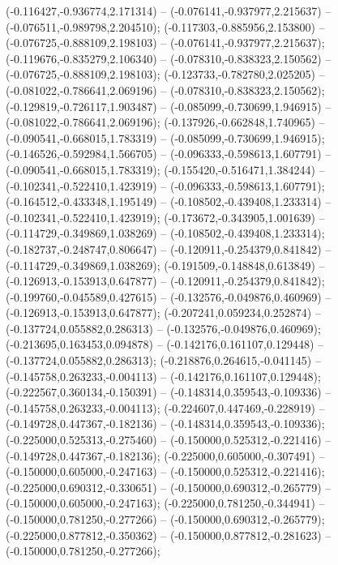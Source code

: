  (-0.116427,-0.936774,2.171314) -- (-0.076141,-0.937977,2.215637) -- (-0.076511,-0.989798,2.204510);
 (-0.117303,-0.885956,2.153800) -- (-0.076725,-0.888109,2.198103) -- (-0.076141,-0.937977,2.215637);
 (-0.119676,-0.835279,2.106340) -- (-0.078310,-0.838323,2.150562) -- (-0.076725,-0.888109,2.198103);
 (-0.123733,-0.782780,2.025205) -- (-0.081022,-0.786641,2.069196) -- (-0.078310,-0.838323,2.150562);
 (-0.129819,-0.726117,1.903487) -- (-0.085099,-0.730699,1.946915) -- (-0.081022,-0.786641,2.069196);
 (-0.137926,-0.662848,1.740965) -- (-0.090541,-0.668015,1.783319) -- (-0.085099,-0.730699,1.946915);
 (-0.146526,-0.592984,1.566705) -- (-0.096333,-0.598613,1.607791) -- (-0.090541,-0.668015,1.783319);
 (-0.155420,-0.516471,1.384244) -- (-0.102341,-0.522410,1.423919) -- (-0.096333,-0.598613,1.607791);
 (-0.164512,-0.433348,1.195149) -- (-0.108502,-0.439408,1.233314) -- (-0.102341,-0.522410,1.423919);
 (-0.173672,-0.343905,1.001639) -- (-0.114729,-0.349869,1.038269) -- (-0.108502,-0.439408,1.233314);
 (-0.182737,-0.248747,0.806647) -- (-0.120911,-0.254379,0.841842) -- (-0.114729,-0.349869,1.038269);
 (-0.191509,-0.148848,0.613849) -- (-0.126913,-0.153913,0.647877) -- (-0.120911,-0.254379,0.841842);
 (-0.199760,-0.045589,0.427615) -- (-0.132576,-0.049876,0.460969) -- (-0.126913,-0.153913,0.647877);
 (-0.207241,0.059234,0.252874) -- (-0.137724,0.055882,0.286313) -- (-0.132576,-0.049876,0.460969);
 (-0.213695,0.163453,0.094878) -- (-0.142176,0.161107,0.129448) -- (-0.137724,0.055882,0.286313);
 (-0.218876,0.264615,-0.041145) -- (-0.145758,0.263233,-0.004113) -- (-0.142176,0.161107,0.129448);
 (-0.222567,0.360134,-0.150391) -- (-0.148314,0.359543,-0.109336) -- (-0.145758,0.263233,-0.004113);
 (-0.224607,0.447469,-0.228919) -- (-0.149728,0.447367,-0.182136) -- (-0.148314,0.359543,-0.109336);
 (-0.225000,0.525313,-0.275460) -- (-0.150000,0.525312,-0.221416) -- (-0.149728,0.447367,-0.182136);
 (-0.225000,0.605000,-0.307491) -- (-0.150000,0.605000,-0.247163) -- (-0.150000,0.525312,-0.221416);
 (-0.225000,0.690312,-0.330651) -- (-0.150000,0.690312,-0.265779) -- (-0.150000,0.605000,-0.247163);
 (-0.225000,0.781250,-0.344941) -- (-0.150000,0.781250,-0.277266) -- (-0.150000,0.690312,-0.265779);
 (-0.225000,0.877812,-0.350362) -- (-0.150000,0.877812,-0.281623) -- (-0.150000,0.781250,-0.277266);
